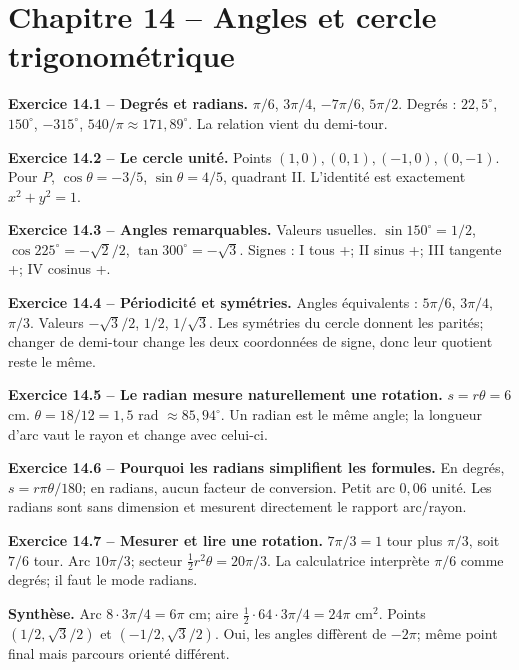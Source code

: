 \chapter*{Chapitre 14 -- Angles et cercle trigonométrique}
\begin{answerbox}
\textbf{Exercice 14.1 -- Degrés et radians.} $\pi/6$, $3\pi/4$, $-7\pi/6$, $5\pi/2$. Degrés : $22{,}5^\circ$, $150^\circ$, $-315^\circ$, $540/\pi\approx171{,}89^\circ$. La relation vient du demi-tour.\par
\textbf{Exercice 14.2 -- Le cercle unité.} Points $(1,0),(0,1),(-1,0),(0,-1)$. Pour $P$, $\cos\theta=-3/5$, $\sin\theta=4/5$, quadrant II. L'identité est exactement $x^2+y^2=1$.\par
\textbf{Exercice 14.3 -- Angles remarquables.} Valeurs usuelles. $\sin150^\circ=1/2$, $\cos225^\circ=-\sqrt2/2$, $\tan300^\circ=-\sqrt3$. Signes : I tous +; II sinus +; III tangente +; IV cosinus +.\par
\textbf{Exercice 14.4 -- Périodicité et symétries.} Angles équivalents : $5\pi/6$, $3\pi/4$, $\pi/3$. Valeurs $-\sqrt3/2$, $1/2$, $1/\sqrt3$. Les symétries du cercle donnent les parités; changer de demi-tour change les deux coordonnées de signe, donc leur quotient reste le même.\par
\textbf{Exercice 14.5 -- Le radian mesure naturellement une rotation.} $s=r\theta=6$ cm. $\theta=18/12=1{,}5$ rad $\approx85{,}94^\circ$. Un radian est le même angle; la longueur d'arc vaut le rayon et change avec celui-ci.\par
\textbf{Exercice 14.6 -- Pourquoi les radians simplifient les formules.} En degrés, $s=r\pi\theta/180$; en radians, aucun facteur de conversion. Petit arc $0{,}06$ unité. Les radians sont sans dimension et mesurent directement le rapport arc/rayon.\par
\textbf{Exercice 14.7 -- Mesurer et lire une rotation.} $7\pi/3=1$ tour plus $\pi/3$, soit $7/6$ tour. Arc $10\pi/3$; secteur $\frac12r^2\theta=20\pi/3$. La calculatrice interprète $\pi/6$ comme degrés; il faut le mode radians.\par
\medskip\textbf{Synthèse.} Arc $8\cdot3\pi/4=6\pi$ cm; aire $\frac12\cdot64\cdot3\pi/4=24\pi$ cm$^2$. Points $(1/2,\sqrt3/2)$ et $(-1/2,\sqrt3/2)$. Oui, les angles diffèrent de $-2\pi$; même point final mais parcours orienté différent.
\end{answerbox}
